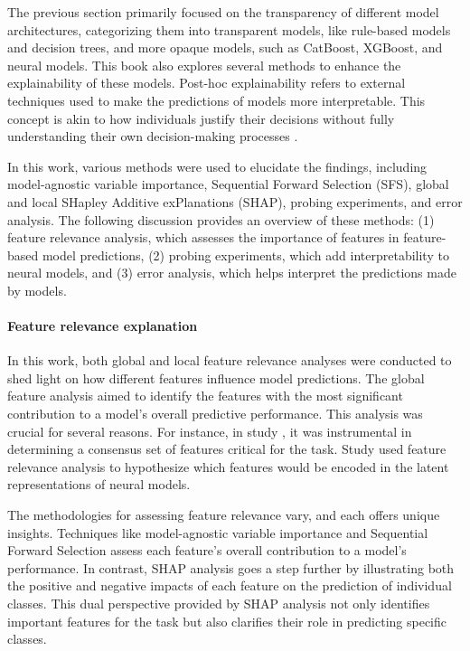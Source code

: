 The previous section primarily focused on the transparency of different model architectures, categorizing them into transparent models, like rule-based models and decision trees, and more opaque models, such as CatBoost, XGBoost, and neural models. This book also explores several  methods \citep{BARREDOARRIETA202082} to enhance the explainability of these models. Post-hoc explainability refers to external techniques used to make the predictions of models more interpretable. This concept is akin to how individuals justify their decisions without fully understanding their own decision-making processes \citep{Dosilovic2018}.

In this work, various methods were used to elucidate the findings, including model-agnostic variable importance, Sequential Forward Selection (SFS), global and local SHapley Additive exPlanations (SHAP), probing experiments, and error analysis. The following discussion provides an overview of these methods: (1) feature relevance analysis, which assesses the importance of features in feature-based model predictions, (2) probing experiments, which add interpretability to neural models, and (3) error analysis, which helps interpret the predictions made by \context models.

\paragraph*{Feature relevance explanation}

In this work, both global and local feature relevance analyses were conducted to shed light on how different features influence model predictions. The global feature analysis aimed to identify the features with the most significant contribution to a model's overall predictive performance. This analysis was crucial for several reasons. For instance, in study \studB, it was instrumental in determining a consensus set of features critical for the \context task. Study \studG used feature relevance analysis to hypothesize which features would be encoded in the latent representations of neural models. 

The methodologies for assessing feature relevance vary, and each offers unique insights. Techniques like model-agnostic variable importance and Sequential Forward Selection assess each feature's overall contribution to a model’s performance. In contrast, SHAP analysis goes a step further by illustrating both the positive and negative impacts of each feature on the prediction of individual classes. This dual perspective provided by SHAP analysis not only identifies important features for the task but also clarifies their role in predicting specific classes.

